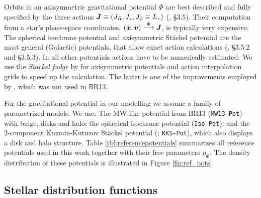 Orbits in an axisymmetric gravitational potential $\Phi$ are best described and fully specified by the three actions $\boldsymbol{J} \equiv (J_R, J_z, J_\phi\equiv L_z)$ (\citealt{2008gady.book.....B}, \S 3.5). Their computation from a star's phase-space coordinates, $(\boldsymbol{x},\boldsymbol{v}) \stackrel{\Phi}{\longrightarrow} \boldsymbol{J}$, is typically very expensive. The spherical isochrone potential \citep{1959AnAp...22..126H} and axisymmetric St\"{a}ckel potential \citep{1985MNRAS.216..273D} are the most general (Galactic) potentials, that allow exact action calculations (\citealt{2008gady.book.....B}, \S 3.5.2 and \S 3.5.3). In all other potentials actions have to be numerically estimated. We use the \emph{St\"{a}ckel fudge} by \citet{2012MNRAS.426.1324B} for axisymmetric potentials and action interpolation grids \citep{2015ApJS..216...29B,2012MNRAS.426.1324B} to speed up the calculation. The latter is one of the improvements employed by \RM{}, which was not used in BR13.

For the gravitational potential in our modelling we assume a family of parametrized models. We use: The MW-like potential from BR13 (\texttt{MW13-Pot}) with bulge, disks and halo; the spherical isochrone potential (\texttt{Iso-Pot}); and the 2-component Kuzmin-Kutuzov St\"{a}ckel potential (\citealt{1994AA...287...43B}; \texttt{KKS-Pot}), which also displays a disk and halo structure. Table \ref{tbl:referencepotentials} summarizes all reference potentials used in this work together with their free parameters $p_\Phi$. The density distribution of these potentials is illustrated in Figure \ref{fig:ref_pots}.


\subsection{Stellar distribution functions} \label{sec:qDF}

